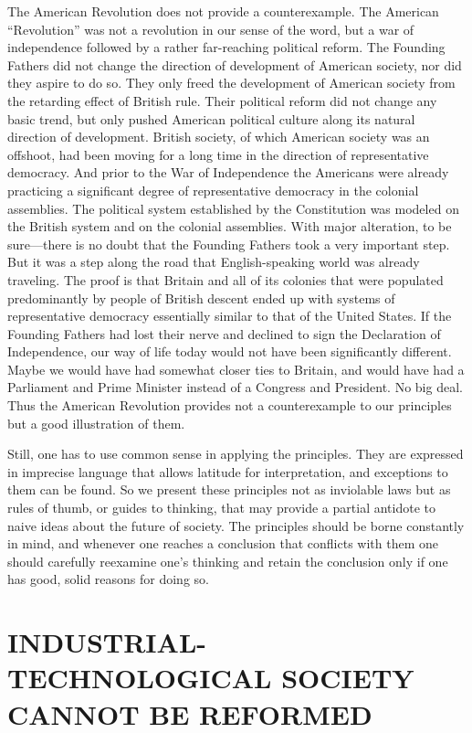  The American Revolution does not provide a counterexample. The American “Revolution” was not a revolution in our sense of the word, but a war of independence followed by a rather far-reaching political reform. The Founding Fathers did not change the direction of development of American society, nor did they aspire to do so. They only freed the development of American society from the retarding effect of British rule. Their political reform did not change any basic trend, but only pushed American political culture along its natural direction of development. British society, of which American society was an offshoot, had been moving for a long time in the direction of representative democracy. And prior to the War of Independence the Americans were already practicing a significant degree of representative democracy in the colonial assemblies. The political system established by the Constitution was modeled on the British system and on the colonial assemblies. With major alteration, to be sure—there is no doubt that the Founding Fathers took a very important step. But it was a step along the road that English-speaking world was already traveling. The proof is that Britain and all of its colonies that were populated predominantly by people of British descent ended up with systems of representative democracy essentially similar to that of the United States. If the Founding Fathers had lost their nerve and declined to sign the Declaration of Independence, our way of life today would not have been significantly different. Maybe we would have had somewhat closer ties to Britain, and would have had a Parliament and Prime Minister instead of a Congress and President. No big deal. Thus the American Revolution provides not a counterexample to our principles but a good illustration of them.

 Still, one has to use common sense in applying the principles. They are expressed in imprecise language that allows latitude for interpretation, and exceptions to them can be found. So we present these principles not as inviolable laws but as rules of thumb, or guides to thinking, that may provide a partial antidote to naive ideas about the future of society. The principles should be borne constantly in mind, and whenever one reaches a conclusion that conflicts with them one should carefully reexamine one’s thinking and retain the conclusion only if one has good, solid reasons for doing so.

\chapter{INDUSTRIAL-TECHNOLOGICAL SOCIETY CANNOT BE REFORMED}

